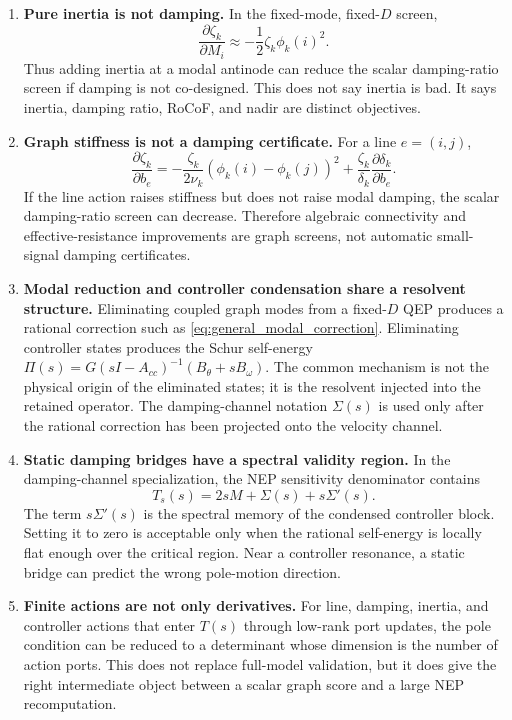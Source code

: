 \begin{enumerate}
\item \textbf{Pure inertia is not damping.} In the fixed-mode, fixed-\(D\)
screen,
\begin{equation}
  \frac{\partial\zeta_k}{\partial M_i}
  \approx
  -\frac{1}{2}\zeta_k\phi_k(i)^2.
  \label{eq:intro_inertia_message}
\end{equation}
Thus adding inertia at a modal antinode can reduce the scalar damping-ratio
screen if damping is not co-designed. This does not say inertia is bad. It
says inertia, damping ratio, RoCoF, and nadir are distinct objectives.

\item \textbf{Graph stiffness is not a damping certificate.} For a line
\(e=(i,j)\),
\begin{equation}
  \frac{\partial\zeta_k}{\partial b_e}
  =
  -\frac{\zeta_k}{2\nu_k}(\phi_k(i)-\phi_k(j))^2
  +
  \frac{\zeta_k}{\delta_k}
  \frac{\partial\delta_k}{\partial b_e}.
  \label{eq:intro_line_message}
\end{equation}
If the line action raises stiffness but does not raise modal damping, the
scalar damping-ratio screen can decrease. Therefore algebraic connectivity and
effective-resistance improvements are graph screens, not automatic
small-signal damping certificates.

\item \textbf{Modal reduction and controller condensation share a resolvent
structure.} Eliminating coupled graph modes from a fixed-\(D\) QEP produces a
rational correction such as \eqref{eq:general_modal_correction}. Eliminating
controller states produces the Schur self-energy
\(\Pi(s)=G(sI-A_{cc})^{-1}(B_\theta+sB_\omega)\). The common mechanism is not
the physical origin of the eliminated states; it is the resolvent injected into
the retained operator. The damping-channel notation \(\Sigma(s)\) is used only
after the rational correction has been projected onto the velocity channel.

\item \textbf{Static damping bridges have a spectral validity region.} In the
damping-channel specialization, the NEP sensitivity denominator contains
\begin{equation}
  T_s(s)=2sM+\Sigma(s)+s\Sigma'(s).
  \label{eq:intro_spectral_memory}
\end{equation}
The term \(s\Sigma'(s)\) is the spectral memory of the condensed controller
block. Setting it to zero is acceptable only when the rational self-energy is
locally flat enough over the critical region. Near a controller resonance, a
static bridge can predict the wrong pole-motion direction.
\item \textbf{Finite actions are not only derivatives.} For line, damping,
inertia, and controller actions that enter \(T(s)\) through low-rank port
updates, the pole condition can be reduced to a determinant whose dimension is
the number of action ports. This does not replace full-model validation, but it
does give the right intermediate object between a scalar graph score and a
large NEP recomputation.
\end{enumerate}

